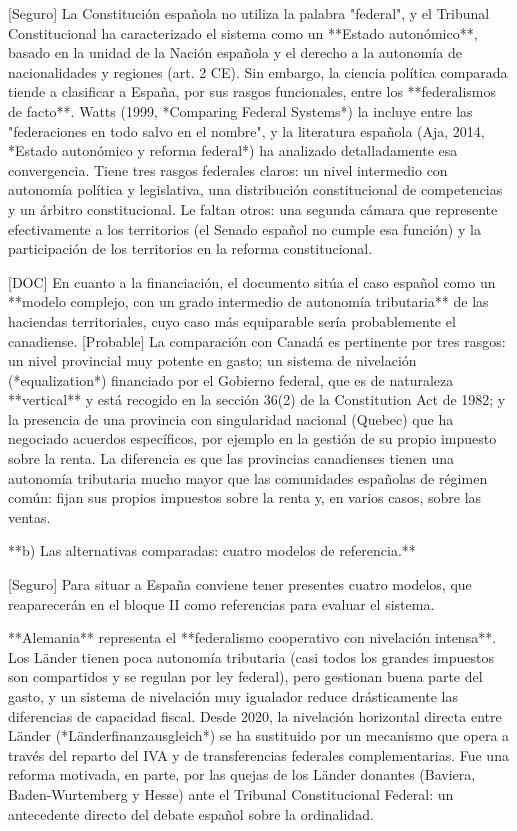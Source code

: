 \documentclass[10pt,a4paper]{article}
\begin{document}
[Seguro] La Constitución española no utiliza la palabra "federal", y el Tribunal Constitucional ha caracterizado el sistema como un **Estado autonómico**, basado en la unidad de la Nación española y el derecho a la autonomía de nacionalidades y regiones (art. 2 CE). Sin embargo, la ciencia política comparada tiende a clasificar a España, por sus rasgos funcionales, entre los **federalismos de facto**. Watts (1999, *Comparing Federal Systems*) la incluye entre las "federaciones en todo salvo en el nombre", y la literatura española (Aja, 2014, *Estado autonómico y reforma federal*) ha analizado detalladamente esa convergencia. Tiene tres rasgos federales claros: un nivel intermedio con autonomía política y legislativa, una distribución constitucional de competencias y un árbitro constitucional. Le faltan otros: una segunda cámara que represente efectivamente a los territorios (el Senado español no cumple esa función) y la participación de los territorios en la reforma constitucional.

[DOC] En cuanto a la financiación, el documento sitúa el caso español como un **modelo complejo, con un grado intermedio de autonomía tributaria** de las haciendas territoriales, cuyo caso más equiparable sería probablemente el canadiense. [Probable] La comparación con Canadá es pertinente por tres rasgos: un nivel provincial muy potente en gasto; un sistema de nivelación (*equalization*) financiado por el Gobierno federal, que es de naturaleza **vertical** y está recogido en la sección 36(2) de la Constitution Act de 1982; y la presencia de una provincia con singularidad nacional (Quebec) que ha negociado acuerdos específicos, por ejemplo en la gestión de su propio impuesto sobre la renta. La diferencia es que las provincias canadienses tienen una autonomía tributaria mucho mayor que las comunidades españolas de régimen común: fijan sus propios impuestos sobre la renta y, en varios casos, sobre las ventas.

**b) Las alternativas comparadas: cuatro modelos de referencia.**

[Seguro] Para situar a España conviene tener presentes cuatro modelos, que reaparecerán en el bloque II como referencias para evaluar el sistema.

**Alemania** representa el **federalismo cooperativo con nivelación intensa**. Los Länder tienen poca autonomía tributaria (casi todos los grandes impuestos son compartidos y se regulan por ley federal), pero gestionan buena parte del gasto, y un sistema de nivelación muy igualador reduce drásticamente las diferencias de capacidad fiscal. Desde 2020, la nivelación horizontal directa entre Länder (*Länderfinanzausgleich*) se ha sustituido por un mecanismo que opera a través del reparto del IVA y de transferencias federales complementarias. Fue una reforma motivada, en parte, por las quejas de los Länder donantes (Baviera, Baden-Wurtemberg y Hesse) ante el Tribunal Constitucional Federal: un antecedente directo del debate español sobre la ordinalidad.
\end{document}
